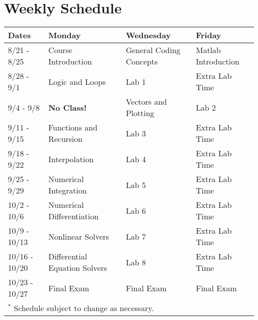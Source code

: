 \documentclass[11pt]{article}
\begin{document}

\newpage

\section*{Weekly Schedule}

\small

\begin{center}
	\begin{tabular}{l || l | l | l }
		\toprule
		\textbf{Dates} & \textbf{Monday} & \textbf{Wednesday} & \textbf{Friday}\\
		\midrule
		8/21  - 8/25  & Course Introduction           & General Coding Concepts & Matlab Introduction  \\
		8/28  - 9/1   & Logic and Loops               & Lab 1                   & Extra Lab Time       \\
		9/4   - 9/8   & \textbf{No Class!}            & Vectors and Plotting    & Lab 2                \\
		9/11  - 9/15  & Functions and Recursion       & Lab 3                   & Extra Lab Time       \\
		9/18  - 9/22  & Interpolation                 & Lab 4                   & Extra Lab Time       \\
		9/25  - 9/29  & Numerical Integration         & Lab 5                   & Extra Lab Time       \\
		10/2  - 10/6  & Numerical Differentiation     & Lab 6                   & Extra Lab Time       \\
		10/9  - 10/13 & Nonlinear Solvers             & Lab 7                   & Extra Lab Time       \\
		10/16 - 10/20 & Differential Equation Solvers & Lab 8                   & Extra Lab Time       \\
		10/23 - 10/27 & Final Exam                    & Final Exam              & Final Exam           \\
		\bottomrule
		\multicolumn{4}{l}{$^{*}$ Schedule subject to change as necessary.}\\
	\end{tabular}
\end{center}
\end{document}
